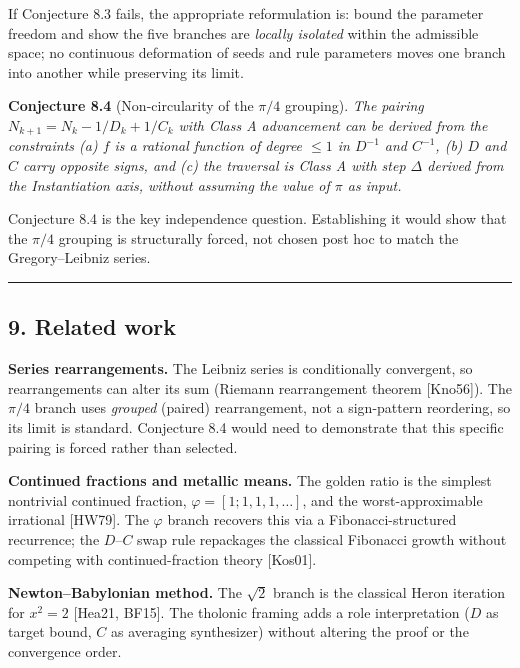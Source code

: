 \documentclass[
  11pt,
  letterpaper,
]{article}
\begin{document}
If Conjecture 8.3 fails, the appropriate reformulation is: bound the
parameter freedom and show the five branches are \emph{locally isolated}
within the admissible space; no continuous deformation of seeds and rule
parameters moves one branch into another while preserving its limit.

\textbf{Conjecture 8.4} (Non-circularity of the \(\pi/4\) grouping).
\emph{The pairing \(N_{k+1} = N_k - 1/D_k + 1/C_k\) with Class A
advancement can be derived from the constraints (a) \(f\) is a rational
function of degree \(\leq 1\) in \(D^{-1}\) and \(C^{-1}\), (b) \(D\)
and \(C\) carry opposite signs, and (c) the traversal is Class A with
step \(\Delta\) derived from the Instantiation axis, without assuming
the value of \(\pi\) as input.}

Conjecture 8.4 is the key independence question. Establishing it would
show that the \(\pi/4\) grouping is structurally forced, not chosen post
hoc to match the Gregory--Leibniz series.

\begin{center}\rule{0.5\linewidth}{0.5pt}\end{center}

\subsection{9. Related work}\label{related-work}

\textbf{Series rearrangements.} The Leibniz series is conditionally
convergent, so rearrangements can alter its sum (Riemann rearrangement
theorem {[}Kno56{]}). The \(\pi/4\) branch uses \emph{grouped} (paired)
rearrangement, not a sign-pattern reordering, so its limit is standard.
Conjecture 8.4 would need to demonstrate that this specific pairing is
forced rather than selected.

\textbf{Continued fractions and metallic means.} The golden ratio is the
simplest nontrivial continued fraction, \(\varphi = [1;1,1,1,\ldots]\),
and the worst-approximable irrational {[}HW79{]}. The \(\varphi\) branch
recovers this via a Fibonacci-structured recurrence; the \(D\)--\(C\)
swap rule repackages the classical Fibonacci growth without competing
with continued-fraction theory {[}Kos01{]}.

\textbf{Newton--Babylonian method.} The \(\sqrt{2}\) branch is the
classical Heron iteration for \(x^2 = 2\) {[}Hea21, BF15{]}. The
tholonic framing adds a role interpretation (\(D\) as target bound,
\(C\) as averaging synthesizer) without altering the proof or the
convergence order.
\end{document}
